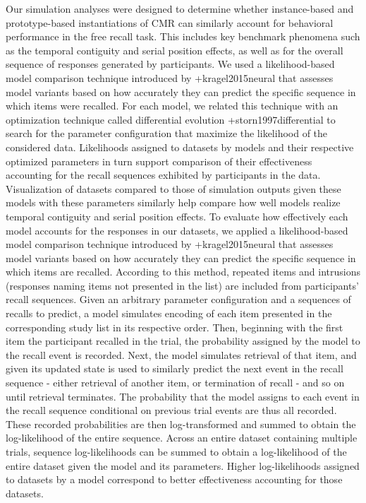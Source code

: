 \markdownRendererInterblockSeparator
{}Our simulation analyses were designed to determine whether instance-based and prototype-based instantiations of CMR can similarly account for behavioral performance in the free recall task. This includes key benchmark phenomena such as the temporal contiguity and serial position effects, as well as for the overall sequence of responses generated by participants. We used a likelihood-based model comparison technique introduced by +{}{}{kragel2015neural} that assesses model variants based on how accurately they can predict the specific sequence in which items were recalled. For each model, we related this technique with an optimization technique called differential evolution +{}{}{storn1997differential} to search for the parameter configuration that maximize the likelihood of the considered data. Likelihoods assigned to datasets by models and their respective optimized parameters in turn support comparison of their effectiveness accounting for the recall sequences exhibited by participants in the data. Visualization of datasets compared to those of simulation outputs given these models with these parameters similarly help compare how well models realize temporal contiguity and serial position effects.\markdownRendererInterblockSeparator
{}\markdownRendererInterblockSeparator
{}To evaluate how effectively each model accounts for the responses in our datasets, we applied a likelihood-based model comparison technique introduced by +{}{}{kragel2015neural} that assesses model variants based on how accurately they can predict the specific sequence in which items are recalled. According to this method, repeated items and intrusions (responses naming items not presented in the list) are included from participants' recall sequences. Given an arbitrary parameter configuration and a sequences of recalls to predict, a model simulates encoding of each item presented in the corresponding study list in its respective order. Then, beginning with the first item the participant recalled in the trial, the probability assigned by the model to the recall event is recorded. Next, the model simulates retrieval of that item, and given its updated state is used to similarly predict the next event in the recall sequence - either retrieval of another item, or termination of recall - and so on until retrieval terminates. The probability that the model assigns to each event in the recall sequence conditional on previous trial events are thus all recorded. These recorded probabilities are then log-transformed and summed to obtain the log-likelihood of the entire sequence. Across an entire dataset containing multiple trials, sequence log-likelihoods can be summed to obtain a log-likelihood of the entire dataset given the model and its parameters. Higher log-likelihoods assigned to datasets by a model correspond to better effectiveness accounting for those datasets.\markdownRendererInterblockSeparator
